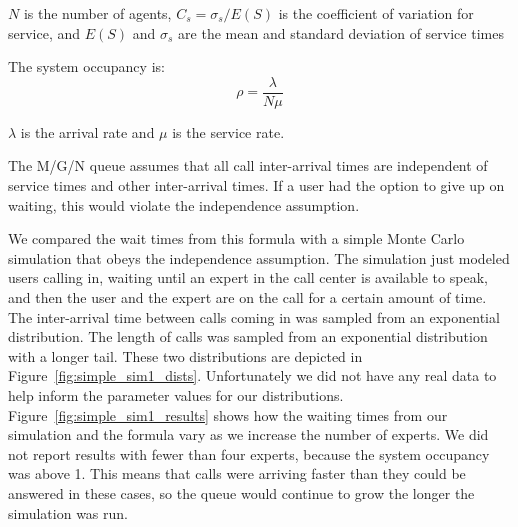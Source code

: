 $N$ is the number of agents,
$C_s = \sigma_s / E(S)$ is the coefficient of variation for service, and
$E(S)$ and $\sigma_s$ are the mean and standard deviation of service times

The system occupancy is:
\[
\rho = \frac{\lambda}{N \mu}
\]

$\lambda$ is the arrival rate and $\mu$ is the service rate.

The M/G/N queue assumes that all call inter-arrival times are independent of
service times and other inter-arrival times.
If a user had the option to give up on waiting, this would violate the
independence assumption.

We compared the wait times from this formula with a simple Monte Carlo
simulation that obeys the independence assumption.
The simulation just modeled users calling in, waiting until an expert in the
call center is available to speak, and then the user and the expert are on the
call for a certain amount of time.
The inter-arrival time between calls coming in was sampled from an exponential
distribution.
The length of calls was sampled from an exponential distribution with a longer
tail.
These two distributions are depicted in Figure~\ref{fig:simple_sim1_dists}.
Unfortunately we did not have any real data to help inform the parameter values
for our distributions.
Figure~\ref{fig:simple_sim1_results} shows how the waiting times from our
simulation and the formula vary as we increase the number of experts.
We did not report results with fewer than four experts, because the system
occupancy was above 1.
This means that calls were arriving faster than they could be answered in these
cases, so the queue would continue to grow the longer the simulation was run.

